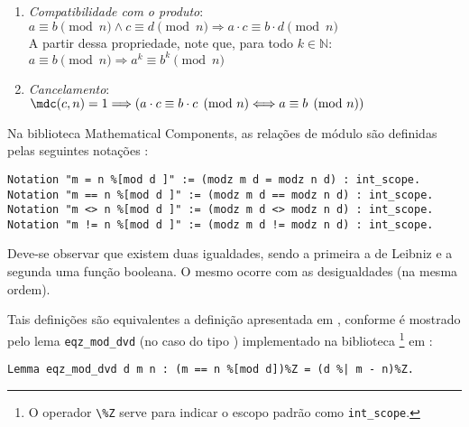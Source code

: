 \begin{enumerate}
    \item \label{item:propcong6-produto} \textit{Compatibilidade com o produto}: 
    \\
    $a \equiv b \pmod{n} \land c \equiv d \pmod{n} \Longrightarrow a \cdot c \equiv b \cdot d \pmod{n}$ 
    \\
    A partir dessa propriedade, note que, para todo $k \in \mathbb{N}$:
    \\
    $a \equiv b \pmod{n} \Longrightarrow a^k \equiv b^k \pmod{n}$

    \item \label{item:propcong7-cancelamento} \textit{Cancelamento}:
    \\
    $\mdc(c, n) = 1 \Longrightarrow (a \cdot c \equiv b \cdot c \pmod{n} \Longleftrightarrow a \equiv b \pmod{n})$
    \\
\end{enumerate}

Na biblioteca Mathematical Components, as relações de módulo são definidas pelas seguintes notações \cite{mathcomp-intdiv}:
    \begin{lstlisting}[language=coq,frame=single,tabsize=1]
Notation "m = n %[mod d ]" := (modz m d = modz n d) : int_scope.
Notation "m == n %[mod d ]" := (modz m d == modz n d) : int_scope.
Notation "m <> n %[mod d ]" := (modz m d <> modz n d) : int_scope.
Notation "m != n %[mod d ]" := (modz m d != modz n d) : int_scope.
    \end{lstlisting}
Deve-se observar que existem duas igualdades, sendo a primeira a de Leibniz e a segunda uma função booleana. O mesmo ocorre com as desigualdades (na mesma ordem).

Tais definições são equivalentes a definição apresentada em \cite[p.~34]{book:2399854}, conforme é mostrado pelo lema \lstinline[language = coq]{eqz_mod_dvd} (no caso do tipo ) implementado na biblioteca \footnote{O operador \lstinline[language = coq]{\%Z} serve para indicar o escopo padrão como \lstinline[language=coq]|int_scope|.} em \cite{mathcomp-intdiv}:
    \begin{lstlisting}[language=coq,frame=single,tabsize=1]
Lemma eqz_mod_dvd d m n : (m == n %[mod d])%Z = (d %| m - n)%Z.
    \end{lstlisting}

